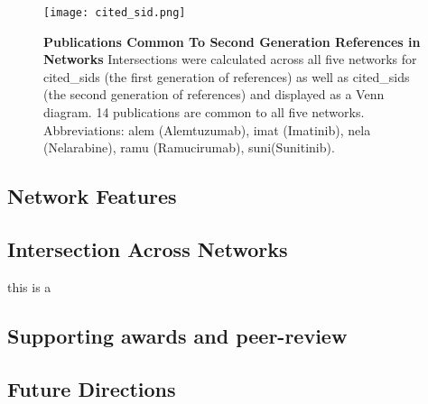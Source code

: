\documentclass[10pt,letterpaper]{article}
\begin{document}
\begin{figure}[!h]
\centering
\texttt{[image: cited\_sid.png]}
\caption{{\bf Publications Common To Second Generation References in Networks}
Intersections were calculated across all five networks for cited\_sids (the first generation of references) as well as cited\_sids (the second generation of references) and displayed as a Venn diagram.
14  publications are common to all five networks. Abbreviations: alem (Alemtuzumab), imat (Imatinib), nela (Nelarabine), ramu (Ramucirumab), suni(Sunitinib).}
\label{fig2}
\end{figure}

\subsection*{Network Features}
\subsection*{Intersection Across Networks} this is a 
\subsection*{Supporting awards and peer-review}
\subsection*{Future Directions}
\end{document}
